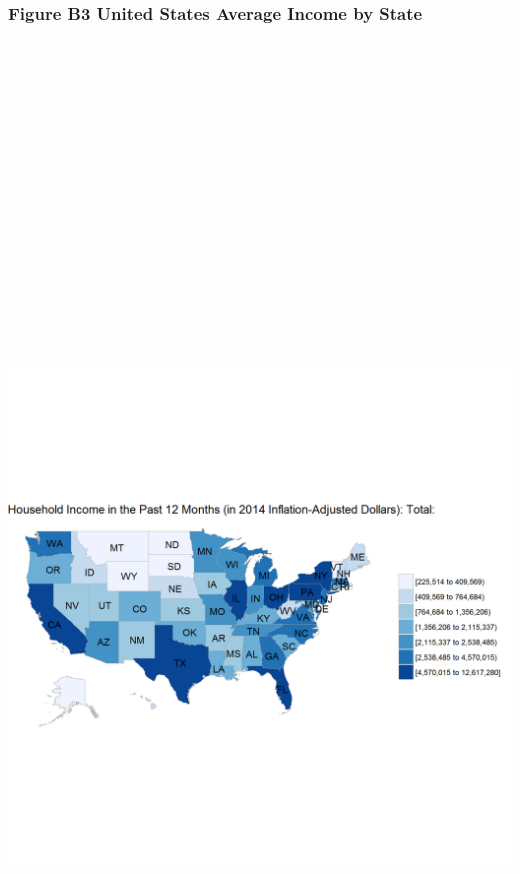 \documentclass[]{article}
\begin{document}
\newpage

\subsubsection{Figure B3 United States Average Income by
State}\label{figure-b3-united-states-average-income-by-state}

\section{\texorpdfstring{\protect\includegraphics[height=12.50000in]{images/state_income.png}}{US Average Income by State}}\label{us-average-income-by-state}
\end{document}
